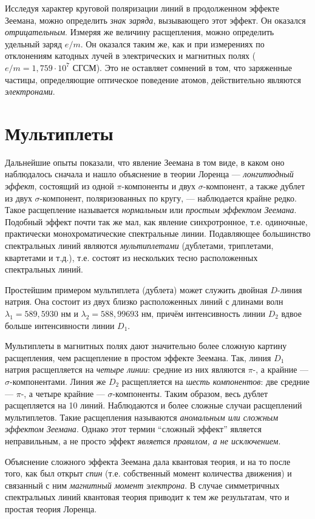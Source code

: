 \documentclass[12pt]{article}
\begin{document}
  Исследуя характер круговой поляризации линий в продолженном эффекте Зеемана, можно определить \textit{знак заряда}, вызывающего этот эффект. Он оказался \textit{отрицательным}. Измеряя же величину расщепления, можно определить удельный заряд $e/m$. Он оказался таким же, как и при измерениях по отклонениям катодных лучей в электрических и магнитных полях
  ($e/m = 1{,}759 \cdot 10^7$ СГСМ). Это не оставляет сомнений в том, что заряженные частицы, определяющие оптическое поведение атомов, действительно являются \textit{электронами}.

  \section{Мультиплеты}
  Дальнейшие опыты показали, что явление Зеемана в том виде, в каком оно наблюдалось сначала и нашло объяснение в теории Лоренца — \textit{лонгитюдный эффект}, состоящий из одной $\pi$-компоненты и двух $\sigma$-компонент, а также дублет из двух $\sigma$-компонент, поляризованных по кругу, — наблюдается крайне редко. Такое расщепление называется \textit{нормальным} или \textit{простым эффектом Зеемана}. Подобный эффект почти так же мал, как явление синхротронное, т.е. одиночные, практически монохроматические спектральные линии. Подавляющее большинство спектральных линий являются \textit{мультиплетами} (дублетами, триплетами, квартетами и т.д.), т.е. состоят из нескольких тесно расположенных спектральных линий.

  Простейшим примером мультиплета (дублета) может служить двойная $D$-линия натрия. Она состоит из двух близко расположенных линий с длинами волн $\lambda_1 = 589{,}5930$ нм и $\lambda_2 = 588{,}99693$ нм, причём интенсивность линии $D_2$ вдвое больше интенсивности линии $D_1$.

  Мультиплеты в магнитных полях дают значительно более сложную картину расщепления, чем расщепление в простом эффекте Зеемана. Так, линия $D_1$ натрия расщепляется на \textit{четыре линии}: средние из них являются $\pi$-, а крайние — $\sigma$-компонентами. Линия же $D_2$ расщепляется на \textit{шесть компонентов}: две средние — $\pi$-, а четыре крайние — $\sigma$-компоненты. Таким образом, весь дублет расщепляется на 10 линий. Наблюдаются и более сложные случаи расщеплений мультиплетов. Такие расщепления называются \textit{аномальным или сложным эффектом Зеемана}. Однако этот термин ``сложный эффект'' является неправильным, а не просто эффект \textit{является правилом, а не исключением}.

  Объяснение сложного эффекта Зеемана дала квантовая теория, и на то после того, как был открыт \textit{спин} (т.е. собственный момент количества движения) и связанный с ним \textit{магнитный момент электрона}. В случае симметричных спектральных линий квантовая теория приводит к тем же результатам, что и простая теория Лоренца.


  
  
\end{document}
